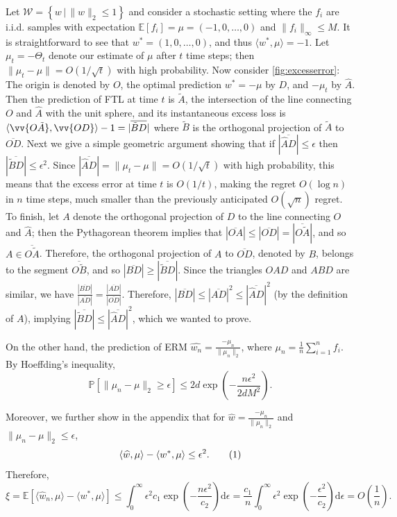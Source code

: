 \documentclass[english]{article}
\newcommand{\cW}{\mathcal{W}}
\newcommand{\Exp}[1]{\mathbb{E}\left[ #1 \right]}
\newcommand{\inpro}[2]{\langle #1, #2\rangle}
\newcommand{\set}[2]{\left\{#1 \,\vert\, #2 \right\}}
\newcommand{\what}[1]{\widehat{#1}}
\newcommand\numberthis{\addtocounter{equation}{1}\tag{\theequation}}
\newcommand{\Prob}[1]{\mathbb{P}\left[#1\right]}
\begin{document}
Let $\cW = \set{w}{\|w\|_2\le 1}$ and consider a stochastic setting where the $f_i$ are i.i.d. samples %
with expectation $\Exp{f_i} = \mu = (-1,0,\ldots,0)$ and $\|f_i\|_\infty\le M$.
It is straightforward to see that $w^* = (1,0,\ldots,0)$, and thus $\inpro{w^*}{\mu} = -1$. Let $\mu_t=-\Theta_t$ denote our estimate of $\mu$ after $t$ time steps; then $\|\mu_t-\mu\| = O(1/\sqrt{t})$
with high probability.
Now consider \cref{fig:excesserror}: The origin is denoted by $O$, the optimal prediction $w^*=-\mu$ by $D$, and $-\mu_t$ by $\hat{A}$. Then the prediction of 
FTL at time $t$ is $\tilde{A}$, the intersection of the line connecting $O$ and $\hat{A}$ with the unit sphere, and its instantaneous excess loss is
$\inpro{\vv{O\tilde{A}}}{\vv{OD}} - 1 = |\overline{\tilde{B}D}|$ where $\tilde{B}$ is the orthogonal projection of $\tilde{A}$ to $\overline{OD}$. 
Next we give a simple geometric argument showing that if $|\overline{\hat{A}D}| \le \epsilon$ then $|\overline{\tilde{B}D}| \le \epsilon^2$. Since 
$|\overline{\hat{A}D}|=\|\mu_t - \mu\| = O(1/\sqrt{t})$ with high probability, this means that the excess error at time $t$ is $O(1/t)$, making the regret $O(\log n)$ %
in $n$ time steps, much smaller than the 
previously anticipated $O(\sqrt{n})$ regret. 
To finish, let  $A$ denote the orthogonal projection of $D$ to the line connecting $O$ and $\hat{A}$; then the Pythagorean theorem implies that $|\overline{OA}| \le |\overline{OD}|=|\overline{O\tilde{A}}|$, and so
$A \in \overline{O\tilde{A}}$. Therefore, the orthogonal projection of $A$ to $\overline{OD}$, denoted by $B$, belongs to the segment $\overline{O\tilde{B}}$,
and so $|\overline{BD}| \ge |\overline{\tilde{B}D}|$. Since the triangles $OAD$ and $ABD$ are similar, we have $\frac{|\overline{BD}|}{|\overline{AD}|} = \frac{|\overline{AD}|}{|\overline{OD}|}$. Therefore, 
$|\overline{BD}| \le |\overline{AD}|^2 \le |\overline{\hat{A}D}|^2$ (by the definition of $A$), implying $|\overline{\tilde{B}D}| \le |\overline{\hat{A}D}|^2$, which we wanted to prove.

On the other hand, the prediction of ERM $\what{w_n} = \frac{-\mu_n}{\|\mu_n\|_2}$, where $\mu_n = \frac{1}{n}\sum_{i=1}^n f_i$.
By Hoeffding's inequality, 
\[
\Prob{ \|\mu_n - \mu\|_2 \ge \epsilon } \le 2d\exp\left(-\frac{n\epsilon^2}{2dM^2}\right).
\]

Moreover, we further show in the appendix that for $\what{w} = \frac{-\mu_n}{\|\mu_n\|_2}$ and $\|\mu_n - \mu\|_2 \le \epsilon$, 
\[
\inpro{\what{w}}{\mu} - \inpro{w^*}{\mu} \le \epsilon^2. \numberthis\label{eq:exampleloss}
\]
Therefore,
\[
\xi = \Exp{\inpro{\hat{w}_n}{\mu} - \inpro{w^*}{\mu}} \le \int_{0}^{\infty} \epsilon^2 c_1\exp\left(-\frac{n\epsilon^2}{c_2}\right) \text{d}\epsilon = \frac{c_1}{n}\int_{0}^{\infty} \epsilon^2\exp\left(-\frac{\epsilon^2}{c_2}\right) \text{d}\epsilon = O(\frac{1}{n}).
\]
\fi
\end{document}
